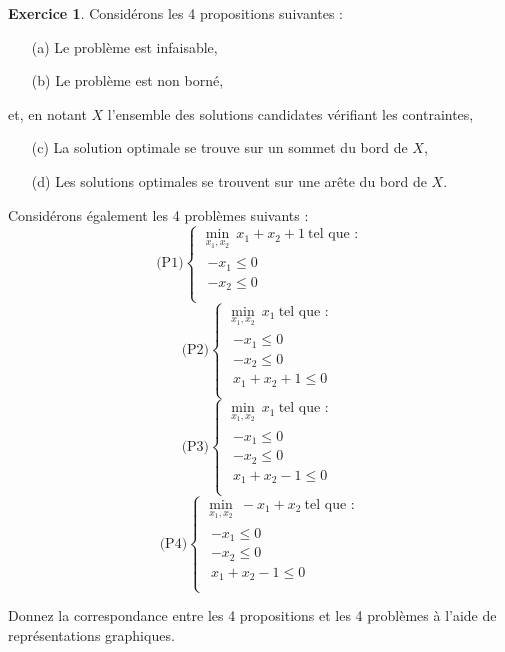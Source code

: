 \documentclass[a4paper,francais]{article}
\theoremstyle{definition}
\newtheorem{exercice}{Exercice}[section]
\begin{document}
\begin{exercice}
  \label{ex:ex}
  Considérons les 4 propositions suivantes :
  \begin{itemize}
  \item[(a)] Le problème est infaisable,
  \item[(b)] Le problème est non borné,
  \end{itemize}
  et, en notant $X$ l'ensemble des
  solutions candidates vérifiant les contraintes,
  \begin{itemize}
  \item[(c)] La solution optimale se trouve sur un sommet du bord de $X$,
  \item[(d)] Les solutions optimales se trouvent sur une arête du bord de $X$.
  \end{itemize}
  
  Considérons également les 4 problèmes suivants :
  \[
  \text{(P1)}
  \left\{
  \begin{array}{c}
    \min_{x_1,x_2} \ x_1 + x_2 + 1 \ \text{tel que :} \\
    \begin{array}{ll}
      -x_1 \leq 0 \\
      -x_2 \leq 0 \\
    \end{array} 
  \end{array}
  \right.
  \]
  \[
  \text{(P2)}
  \left\{
  \begin{array}{c}
    \min_{x_1,x_2} \ x_1 \ \text{tel que :} \\
    \begin{array}{ll}
      -x_1 \leq 0 \\
      -x_2 \leq 0 \\
      x_1 + x_2 + 1 \leq 0 \\
    \end{array} 
  \end{array}
  \right.
  \]
  \[
  \text{(P3)}
  \left\{
  \begin{array}{c}
    \min_{x_1,x_2} \ x_1 \ \text{tel que :} \\
    \begin{array}{ll}
      -x_1 \leq 0 \\
      -x_2 \leq 0 \\
      x_1 + x_2 - 1 \leq 0 \\
    \end{array} 
  \end{array}
  \right.
  \]
  \[
  \text{(P4)}
  \left\{
  \begin{array}{c}
    \min_{x_1,x_2} \ -x_1+x_2 \ \text{tel que :} \\
    \begin{array}{ll}
      -x_1 \leq 0 \\
      -x_2 \leq 0 \\
      x_1 + x_2 - 1 \leq 0 \\
    \end{array} 
  \end{array}
  \right.
  \]

  Donnez la correspondance entre les 4 propositions et les 4 problèmes
  à l'aide de représentations graphiques.
\end{exercice}
\end{document}
